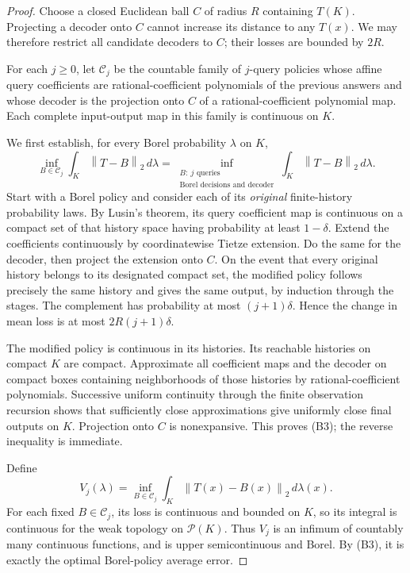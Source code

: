 \documentclass[11pt,a4paper]{article}
\newcommand{\norm}[1]{\left\lVert#1\right\rVert}
\theoremstyle{definition}
\theoremstyle{remark}
\numberwithin{equation}{section}
\begin{document}
\begin{proof}
Choose a closed Euclidean ball \(C\) of radius \(R\) containing \(T(K)\).
Projecting a decoder onto \(C\) cannot increase its distance to any
\(T(x)\). We may therefore restrict all candidate decoders to \(C\);
their losses are bounded by \(2R\).

For each \(j\ge0\), let \(\mathcal C_j\) be the countable family of
\(j\)-query policies whose affine query coefficients are
rational-coefficient polynomials of the previous answers and whose
decoder is the projection onto \(C\) of a rational-coefficient
polynomial map. Each complete input-output map in this family is
continuous on \(K\).

We first establish, for every Borel probability \(\lambda\) on \(K\),
\[
 \inf_{B\in\mathcal C_j}\int_K\norm{T-B}_2\,d\lambda
   =\inf_{\substack{B:\ j\text{ queries}\\
                    \text{Borel decisions and decoder}}}
                  \int_K\norm{T-B}_2\,d\lambda .
 \tag{B3}
\]
Start with a Borel policy and consider each of its \emph{original}
finite-history probability laws. By Lusin's theorem, its query
coefficient map is continuous on a compact set of that history space
having probability at least \(1-\delta\). Extend the coefficients
continuously by coordinatewise Tietze extension. Do the same for the
decoder, then project the extension onto \(C\). On the event that
every original history belongs to its designated compact set, the
modified policy follows precisely the same history and gives the
same output, by induction through the stages. The complement has
probability at most \((j+1)\delta\). Hence the change in mean loss is
at most \(2R(j+1)\delta\).

The modified policy is continuous in its histories. Its reachable
histories on compact \(K\) are compact. Approximate all coefficient
maps and the decoder on compact boxes containing neighborhoods of
those histories by rational-coefficient polynomials. Successive
uniform continuity through the finite observation recursion shows
that sufficiently close approximations give uniformly close final
outputs on \(K\). Projection onto \(C\) is nonexpansive. This proves
(B3); the reverse inequality is immediate.

Define
\[
              V_j(\lambda)=
              \inf_{B\in\mathcal C_j}
                    \int_K\norm{T(x)-B(x)}_2\,d\lambda(x).
 \tag{B4}
\]
For each fixed \(B\in\mathcal C_j\), its loss is continuous and
bounded on \(K\), so its integral is continuous for the weak topology
on \(\mathcal P(K)\). Thus \(V_j\) is an infimum of countably many
continuous functions, and is upper semicontinuous and Borel.
By (B3), it is exactly the optimal Borel-policy average error.


\end{proof}
\end{document}

